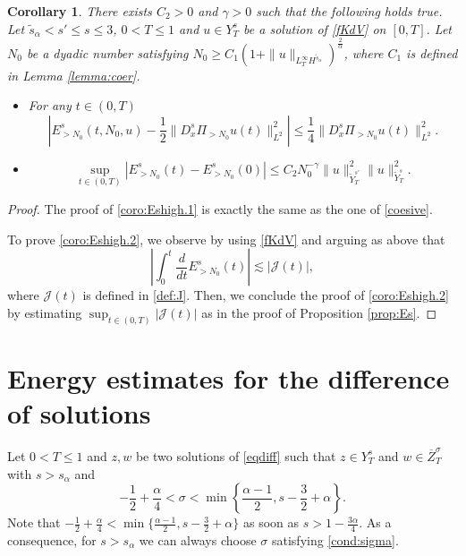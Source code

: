 \documentclass{amsart}
\newtheorem{corollary}[theorem]{Corollary}
\theoremstyle{definition}
\theoremstyle{remark}
\numberwithin{equation}{section}
\begin{document}
\begin{corollary} \label{coro:Eshigh}
There exists $C_2>0$ and $\gamma>0$ such that the following holds true. Let $\widetilde{s}_\alpha<s'\le s \le 3$, $0<T\le 1$ and $u\in Y^s_T$ be a solution of \eqref{fKdV} on $[0,T]$. Let $N_0$ be a dyadic number satisfying $N_0\ge  C_1 (1+\|u\|_{L^\infty_TH^{\widetilde{s}_\alpha}})^{\frac 2 \alpha}$, where $C_1$ is defined in Lemma \ref{lemma:coer}. 
\begin{itemize}
\item[(i)] For any $t\in (0,T)$   
\begin{equation}\label{coro:Eshigh.1}
    \left| E^s_{>N_0}(t,N_0,u) - \frac 12\|D^s_x\Pi_{>N_0}u(t)\|_{L^2}^2\right|\le \frac 14\|D^s_x\Pi_{>N_0}u(t)\|_{L^2}^2.
  \end{equation}
  \item[(ii)]   \begin{equation}\label{coro:Eshigh.2}
    \sup_{t\in (0,T)} \left|E^s_{>N_0}(t)-E^s_{>N_0}(0)\right| \leq C_2 N_0^{-\gamma} \|u\|_{\widetilde{Y}^{s'}_T}^2\|u\|_{\widetilde{Y}^s_T}^2 .
  \end{equation}
  \end{itemize}
\end{corollary}

\begin{proof} The proof of \eqref{coro:Eshigh.1} is exactly the same as the one of \eqref{coesive}. 

To prove \eqref{coro:Eshigh.2}, we observe by using \eqref{fKdV} and arguing as above that
\begin{equation*}
\left|\int_0^t\frac{d}{dt}E^s_{>N_0}(t)\right| \lesssim |\mathcal{J}(t)| ,
\end{equation*}
where $\mathcal{J}(t)$ is defined in \eqref{def:J}. Then, we conclude the proof of  \eqref{coro:Eshigh.2} by estimating $\sup_{t \in (0,T)} |\mathcal{J}(t)|$ as in the proof of Proposition \ref{prop:Es}. 
\end{proof}

\section{Energy estimates for the difference of solutions} \label{Sec:5}
Let $0<T\le 1$ and $z, w$ be two solutions of \eqref{eqdiff} such that $z\in Y^s_T$ and $w\in \overline{Z}^\sigma_T$ with $s>s_\alpha$ and 
\begin{equation}\label{cond:sigma} 
-\frac 1 2 +\frac \alpha 4< \sigma<\min \left\{\frac{\alpha-1}2,s-\frac 32+ \alpha\right\}.
\end{equation}
Note that $-\frac 1 2 +\frac \alpha 4 < \min \{\frac{\alpha-1}2,s-\frac 32+ \alpha\}$ as soon as $s>1-\frac{3\alpha}4$. As a consequence, for $s>s_\alpha$ we can always choose $\sigma$ satisfying \eqref{cond:sigma}.
\end{document}
